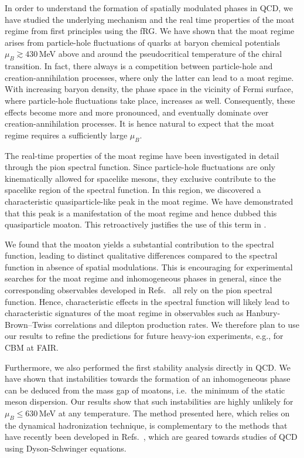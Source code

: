 \documentclass[reprint,english,superscriptaddress,preprintnumbers,amsmath,amssymb,aps,prd,nofootinbib]{revtex4-2}
\begin{document}
In order to understand the formation of spatially modulated phases in QCD, we have studied the underlying mechanism and the real time properties of the moat regime from first principles using the fRG. We have shown that the moat regime arises from particle-hole fluctuations of quarks at baryon chemical potentials $\mu_B \gtrsim 430$\,MeV above and around the pseudocritical temperature of the chiral transition. In fact, there always is a competition between particle-hole and creation-annihilation processes, where only the latter can lead to a moat regime. With increasing baryon density, the phase space in the vicinity of Fermi surface, where particle-hole fluctuations take place, increases as well. 
Consequently, these effects become more and more pronounced, and eventually dominate over creation-annihilation processes. It is hence natural to expect that the moat regime requires a sufficiently large $\mu_B$.

The real-time properties of the moat regime have been investigated in detail through the pion spectral function. Since particle-hole fluctuations are only kinematically allowed for spacelike mesons, they exclusive contribute to the spacelike region of the spectral function. In this region, we discovered a characteristic quasiparticle-like peak in the moat regime. We have demonstrated that this peak is a manifestation of the moat regime and hence dubbed this quasiparticle moaton. This retroactively justifies the use of this term in \cite{Nussinov:2024erh}.

We found that the moaton yields a substantial contribution to the spectral function, leading to distinct qualitative differences compared to the spectral function in absence of spatial modulations. This is encouraging for experimental searches for the moat regime and inhomogeneous phases in general, since the corresponding observables developed in Refs.\ \cite{Pisarski:2021qof, Rennecke:2023xhc, Nussinov:2024erh} all rely on the pion spectral function. Hence, characteristic effects in the spectral function will likely lead to characteristic signatures of the moat regime in observables such as Hanbury-Brown--Twiss correlations and dilepton production rates. We therefore plan to use our results to refine the predictions for future heavy-ion experiments, e.g., for CBM at FAIR.  

Furthermore, we also performed the first stability analysis directly in QCD. We have shown that instabilities towards the formation of an inhomogeneous phase can be deduced from the mass gap of moatons, i.e.\ the minimum of the static meson dispersion. Our results show that such instabilities are highly unlikely for $\mu_B \leq 630$\,MeV at any temperature. The method presented here, which relies on the dynamical hadronization technique, is complementary to the methods that have recently been developed in Refs.\ \cite{Motta:2023pks, Motta:2024agi, Motta:2024rvk}, which are geared towards studies of QCD using Dyson-Schwinger equations.
\end{document}
